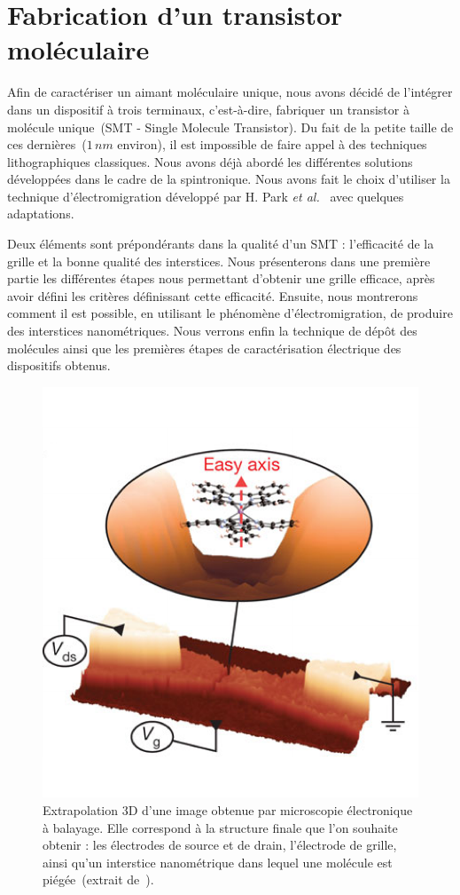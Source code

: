 \chapter{Fabrication d'un transistor moléculaire}
Afin de caractériser un aimant moléculaire unique, nous avons décidé de l'intégrer dans un dispositif à trois terminaux, c'est-à-dire, fabriquer un transistor à molécule unique~(SMT - Single Molecule Transistor). Du fait de la petite taille de ces dernières~($1\,nm$ environ), il est impossible de faire appel à des techniques lithographiques classiques. Nous avons déjà abordé les différentes solutions développées dans le cadre de la spintronique. Nous avons fait le choix d'utiliser la technique d'électromigration développé par H. Park \textit{et al.}~\cite{Park1999} avec quelques adaptations.

Deux éléments sont prépondérants dans la qualité d'un SMT : l’efficacité de la grille et la bonne qualité des interstices. Nous présenterons dans une première partie les différentes étapes nous permettant d'obtenir une grille efficace, après avoir défini les critères définissant cette efficacité. Ensuite, nous montrerons comment il est possible, en utilisant le phénomène d'électromigration, de produire des interstices nanométriques. Nous verrons enfin la technique de dépôt des molécules ainsi que les premières étapes de caractérisation électrique des dispositifs obtenus.


\begin{figure}
\parbox{6.5cm}{
\includegraphics[scale=0.45]{Fabrication/ImageTrans/ImageTrans.pdf} 
}
\parbox{7cm}{\caption{Extrapolation 3D d'une image obtenue par microscopie électronique à balayage. Elle correspond à la structure finale que l'on souhaite obtenir : les électrodes de source et de drain, l'électrode de grille, ainsi qu'un interstice nanométrique dans lequel une molécule est piégée~(extrait de~\cite{Vincent2012}).}
\label{ImageTrans}
}
\end{figure}

